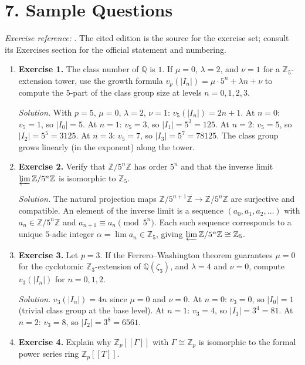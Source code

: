 \section*{7. Sample Questions}
\emph{Exercise reference:} \cite{iwasawa_theory_ref1}. The cited edition is the source for the exercise set; consult its Exercises section for the official statement and numbering.
\begin{enumerate}[leftmargin=*,itemsep=0.9em]
\item \textbf{Exercise 1.} The class number of $\mathbb{Q}$ is $1$. If $\mu=0$, $\lambda=2$, and $\nu=1$ for a $\mathbb{Z}_5$-extension tower, use the growth formula $v_p(|I_n|)=\mu\cdot 5^n+\lambda n+\nu$ to compute the $5$-part of the class group size at levels $n=0,1,2,3$.

\emph{Solution.} With $p=5$, $\mu=0$, $\lambda=2$, $\nu=1$: $v_5(|I_n|)=2n+1$. At $n=0$: $v_5=1$, so $|I_0|=5$. At $n=1$: $v_5=3$, so $|I_1|=5^3=125$. At $n=2$: $v_5=5$, so $|I_2|=5^5=3125$. At $n=3$: $v_5=7$, so $|I_3|=5^7=78125$. The class group grows linearly (in the exponent) along the tower.

\item \textbf{Exercise 2.} Verify that $\mathbb{Z}/5^n\mathbb{Z}$ has order $5^n$ and that the inverse limit $\varprojlim \mathbb{Z}/5^n\mathbb{Z}$ is isomorphic to $\mathbb{Z}_5$.

\emph{Solution.} The natural projection maps $\mathbb{Z}/5^{n+1}\mathbb{Z}\to\mathbb{Z}/5^n\mathbb{Z}$ are surjective and compatible. An element of the inverse limit is a sequence $(a_0,a_1,a_2,\ldots)$ with $a_n\in\mathbb{Z}/5^n\mathbb{Z}$ and $a_{n+1}\equiv a_n\pmod{5^n}$. Each such sequence corresponds to a unique $5$-adic integer $\alpha=\lim a_n\in\mathbb{Z}_5$, giving $\varprojlim\mathbb{Z}/5^n\mathbb{Z}\cong\mathbb{Z}_5$.

\item \textbf{Exercise 3.} Let $p=3$. If the Ferrero--Washington theorem guarantees $\mu=0$ for the cyclotomic $\mathbb{Z}_3$-extension of $\mathbb{Q}(\zeta_3)$, and $\lambda=4$ and $\nu=0$, compute $v_3(|I_n|)$ for $n=0,1,2$.

\emph{Solution.} $v_3(|I_n|)=4n$ since $\mu=0$ and $\nu=0$. At $n=0$: $v_3=0$, so $|I_0|=1$ (trivial class group at the base level). At $n=1$: $v_3=4$, so $|I_1|=3^4=81$. At $n=2$: $v_3=8$, so $|I_2|=3^8=6561$.

\item \textbf{Exercise 4.} Explain why $\mathbb{Z}_p[[\Gamma]]$ with $\Gamma\cong\mathbb{Z}_p$ is isomorphic to the formal power series ring $\mathbb{Z}_p[[T]]$.


\end{enumerate}
